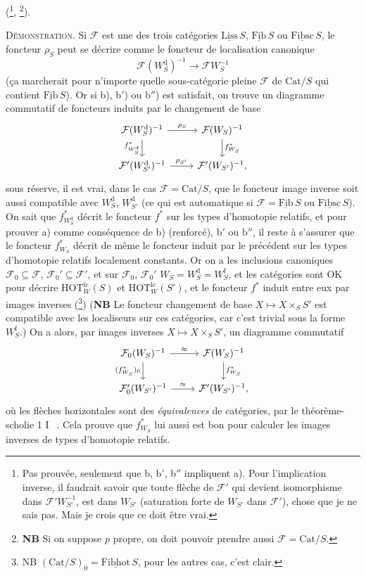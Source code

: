 \documentclass[11pt]{article}
\newcommand{\printedpage}[1]{\marginpar{\footnotesize p.~#1}}
\newcommand{\msp}[1]{\marginpar{\footnotesize [#1]}}
\newcommand{\HOT}{\mathrm{HOT}}
\newcommand{\Cat}{\mathrm{Cat}}
\newcommand{\und}[1]{\underline{\mathrm{#1}}}
\begin{document}
(\footnote[63]{Pas prouvée, seulement que b, b$'$, b$''$ impliquent a). Pour l'implication inverse, il faudrait savoir que toute flèche de $\mathcal{F}'$ qui devient isomorphisme dans $\mathcal{F}'W_{S'}^{-1}$, est dans $W_{S'}$ (saturation forte de $W_{S'}$ dans $\mathcal{F}'$), chose que je ne sais pas. Mais je crois que ce doit être vrai.}, \footnote[64]{\textbf{NB} Si on suppose $p$ propre, on doit pouvoir prendre aussi $\mathcal{F} = \Cat/S$.}).

\textsc{Démonstration.} Si $\mathcal{F}$ est une des trois catégories $\und{Liss}\,S$, $\und{Fib}\,S$ ou $\und{Fibsc}\,S$, le foncteur $\rho_S$ peut se décrire comme le foncteur de localisation canonique
\[
\mathcal{F}(W_S^{\mathrm{d}})^{-1} \longrightarrow \mathcal{F}W_S^{-1}
\]
(ça marcherait pour n'importe quelle sous-catégorie pleine $\mathcal{F}$ de $\Cat/S$ qui contient $\und{Fib}\,S$). Or si b), b$'$) ou b$''$) est satisfait, on trouve un diagramme commutatif de foncteurs induits par le changement de base
\[
\begin{tikzcd}
\mathcal{F}(W_S^{\mathrm{d}})^{-1} \arrow[r, "\rho_S"] \arrow[d, "f^*_{W_S^{\mathrm{d}}}"'] & \mathcal{F}(W_S)^{-1} \arrow[d, "f^*_{W_S}"] \\
\mathcal{F}'(W_{S'}^{\mathrm{d}})^{-1} \arrow[r, "\rho_{S'}"] & \mathcal{F}'(W_{S'})^{-1},
\end{tikzcd}
\]
sous réserve, il est vrai, dans le cas $\mathcal{F} = \Cat/S$, que le foncteur image inverse soit aussi compatible avec $W_S^{\mathrm{d}}$, $W_{S'}^{\mathrm{d}}$ (ce qui est automatique si $\mathcal{F} = \und{Fib}\,S$ ou $\und{Fibsc}\,S$). On sait que $f^*_{W_S^{\mathrm{d}}}$ décrit le foncteur $f^*$ sur les types d'homotopie relatifs, et pour prouver a) comme conséquence
\msp{page 125}
de b) (renforcé), b$'$ ou b$''$, il reste à s'assurer que le foncteur $f^*_{W_S}$ décrit de même le foncteur induit par le précédent sur les types d'homotopie relatifs localement constants. Or on a les inclusions canoniques $\mathcal{F}_0 \subseteq \mathcal{F}$, $\mathcal{F}_0' \subseteq \mathcal{F}'$, et sur $\mathcal{F}_0$, $\mathcal{F}_0'$ $W_S = W_S^{\mathrm{d}} = W_S^{\mathrm{f}}$, et les catégories sont OK pour décrire $\HOT_W^{\mathrm{lc}}(S)$ et $\HOT_W^{\mathrm{lc}}(S')$, et le foncteur $f^*$ induit entre eux par images inverses (\footnote[65]{NB $(\Cat/S)_0 = \und{Fibhot}\,S$, pour les autres cas, c'est clair.}) (\textbf{NB} Le foncteur changement de base $X \longmapsto X \times_S S'$ est compatible avec les localiseurs sur ces catégories, car c'est trivial sous la forme $W_S^{\mathrm{f}}$.) On a alors, par images inverses $X \longmapsto X \times_S S'$, un diagramme commutatif
\[
\begin{tikzcd}
\mathcal{F}_0(W_S)^{-1} \arrow[r, "\approx"] \arrow[d, "(f^*_{W_S})_0"'] & \mathcal{F}(W_S)^{-1} \arrow[d, "f^*_{W_S}"] \\
\mathcal{F}_0'(W_{S'})^{-1} \arrow[r, "\approx"] & \mathcal{F}'(W_{S'})^{-1},
\end{tikzcd}
\]
\printedpage{78}
où les flèches horizontales sont des \textit{équivalences} de catégories, par le théorème-scholie 1 \textcircled{I}~. Cela prouve que $f^*_{W_S}$ lui aussi est bon pour calculer les images inverses de types d'homotopie relatifs.
\end{document}
